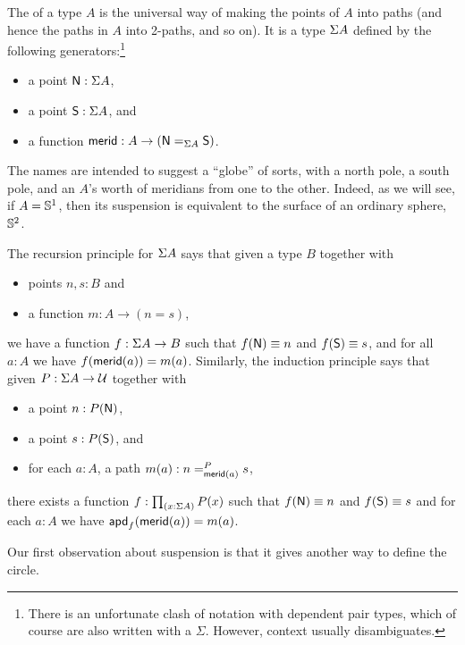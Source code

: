 %
%
The  of a type $A$ is the universal way of making the points of $A$ into paths (and hence the paths in $A$ into 2-paths, and so on).
It is a type $\susp A$ defined by the following generators:\footnote{There is an unfortunate clash of notation with dependent pair types, which of course are also written with a $\Sigma$.
  However, context usually disambiguates.}
\begin{itemize}
\item a point $\north:\susp A$,
\item a point $\south:\susp A$, and
\item a function $\merid:A \to (\id[\susp A]\north\south)$.
\end{itemize}
The names are intended to suggest a ``globe'' of sorts, with a north pole, a south pole, and an $A$'s worth of meridians
%
%
from one to the other.
Indeed, as we will see, if $A=\Sn^1$, then its suspension is equivalent to the surface of an ordinary sphere, $\Sn^2$.

%
The recursion principle for $\susp A$ says that given a type $B$ together with
\begin{itemize}
\item points $n,s:B$ and
\item a function $m:A \to (n=s)$,
\end{itemize}
we have a function $f:\susp A \to B$ such that $f(\north)\jdeq n$ and $f(\south)\jdeq s$, and for all $a:A$ we have $\ap f {\merid(a)} = m(a)$.
%
Similarly, the induction principle says that given $P:\susp A \to \type$ together with
\begin{itemize}
\item a point $n:P(\north)$,
\item a point $s:P(\south)$, and
\item for each $a:A$, a path $m(a):\dpath P{\merid(a)}ns$,
\end{itemize}
there exists a function $f:\prd{x:\susp A} P(x)$ such that $f(\north)\jdeq n$ and $f(\south)\jdeq s$ and for each $a:A$ we have $\apd f {\merid(a)} = m(a)$.

Our first observation about suspension is that it gives another way to define the circle.

